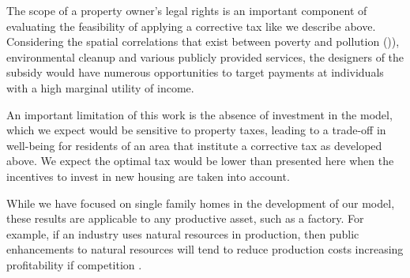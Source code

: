 \documentclass[ecta,nameyear,draft]{econsocart}
\theoremstyle{plain}
\theoremstyle{remark}
\begin{document}
The scope of a property owner's legal rights is an important component of evaluating the feasibility of applying a corrective tax like we describe above. Considering the spatial correlations that exist between poverty and pollution (\cite{banzhafJustice19})), environmental cleanup and various publicly provided services, the designers of the subsidy would have numerous opportunities to target payments at individuals with a high marginal utility of income.

An important limitation of this work is the absence of investment in the model, which we expect would be sensitive to property taxes, leading to a trade-off in well-being for residents of an area that institute a corrective tax as developed above. We expect the optimal tax would be lower than presented here when the incentives to invest in new housing are taken into account. 

While we have focused on single family homes in the development of our model, these results are applicable to any productive asset, such as a factory. For example, if an industry uses natural resources in production, then public enhancements to natural resources will tend to reduce production costs increasing profitability if competition . 
\end{document}

